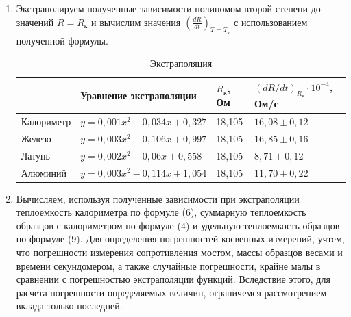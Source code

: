 \documentclass[12pt,a4paper]{article}
\begin{document}
\begin{enumerate}
\item Экстраполируем полученные зависимости полиномом второй степени до значений $R = R_{\text{к}}$ и вычислим значения $(\frac{dR}{dt})_{T = T_{\text{к}}}$ с использованием полученной формулы.

\begin{table}[!h]
	\centering
	\begin{tabular}{|l|l|l|l|}
		\hline
		& Уравнение экстраполяции                     & $R_{\text{к}}$, Ом     & $(dR/dt)_{R_{\text{к}}} \cdot 10^{-4}$, Ом/с     \\ \hline
		Калориметр & $y = 0,001x^2 - 0,034x + 0,327$ & 18,105 & $16,08 \pm 0,12$ \\ \hline
		Железо     & $y = 0,003x^2 - 0,106x + 0,997$ & 18,105 & $16,85 \pm 0,16$ \\ \hline
		Латунь     & $y = 0,002x^2 - 0,06x + 0,558$  & 18,105 & $8,71 \pm 0,12$ \\ \hline
		Алюминий   & $y = 0,003x^2 - 0,114x + 1,054$ & 18,105 & $11,70 \pm 0,22$ \\ \hline
		
	\end{tabular}
	\caption{Экстраполяция}
\end{table}
\item Вычисляем, используя полученные зависимости при экстраполяции теплоемкость калориметра по формуле (6), суммарную теплоемкость образцов с калориметром по формуле (4) и удельную теплоемкость образцов по формуле (9). Для определения погрешностей косвенных измерений, учтем, что погрешности измерения сопротивления мостом, массы образцов весами и времени секундомером, а также случайные погрешности,  крайне малы в сравнении с погрешностью экстраполяции функций. Вследствие этого, для расчета погрешности определяемых величин, ограничемся рассмотрением вклада только последней.


\begin{table}[!h]
	\begin{center}
	\end{center}
	\caption{Результат вычислений теплоемкости}
\end{table}

\end{enumerate}
\end{document}
